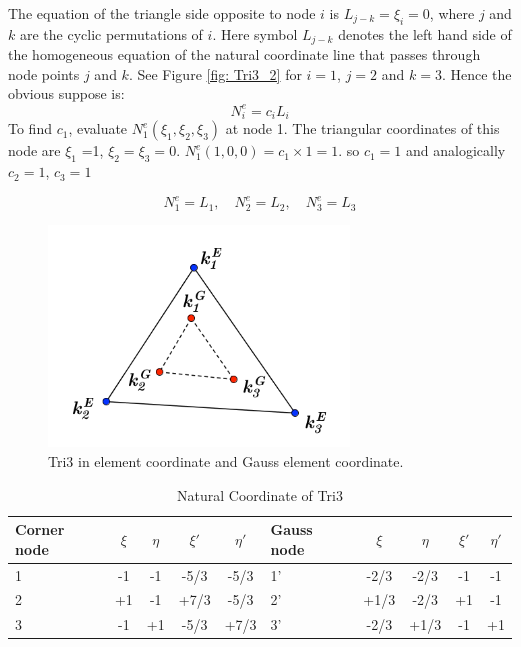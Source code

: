 The equation of the triangle side opposite to node $i$ is $L_{j-k} = \xi_i = 0$, where $j$ and $k$ are the cyclic permutations of $i$. Here symbol $L_{j-k}$ denotes the left hand side of the homogeneous equation of the natural coordinate line that passes through node points $j$ and $k$. See Figure \ref{fig: Tri3_2} for $i = 1$, $j=2$ and $k = 3$. Hence the obvious suppose is:
\begin{equation}
N_i^e = c_iL_i
\end{equation}
To find $c_1$, evaluate $N_1^e\left(\xi_1, \xi_2, \xi_3\right)$ at node 1. The triangular coordinates of this node are $\xi_1$ =1, $\xi_2 = \xi_3 = 0$.  $N_1^e\left(1,0,0\right) = c_1 \times 1 = 1$. so $c_1 = 1$ and analogically $c_2 = 1$, $c_3 = 1$

\begin{equation}
N_1^e = L_1 , \quad N_2^e = L_2, \quad N_3^e = L_3
\end{equation}


\begin{figure}[h]
	\begin{center}
		\includegraphics[width=8cm,clip]{Tri3_1.pdf}			
		\caption{Tri3 in element coordinate and Gauss element coordinate.} \label{fig: Tri3_1}
	\end{center} 
\end{figure}

\begin{table}
	\centering
	\caption{Natural Coordinate of Tri3} \label{tab: Tri3}
	\begin{tabular}{p{1cm}ccccp{1cm}cccc}	
		
		\hline
		Corner node\centering& $\xi$& $\eta$& $\xi'$& $\eta'$& Gauss node\centering& $\xi$& $\eta$& $\xi'$& $\eta'$ \\
		\hline
		1\centering& -1& -1& -5/3& -5/3& 1'\centering& -2/3& -2/3& -1& -1 \\
		2\centering& +1& -1& +7/3& -5/3& 2'\centering&+1/3 & -2/3& +1& -1 \\
		3\centering& -1& +1& -5/3& +7/3& 3'\centering& -2/3& +1/3& -1& +1\\
		\hline
		
	\end{tabular}
\end{table}			



